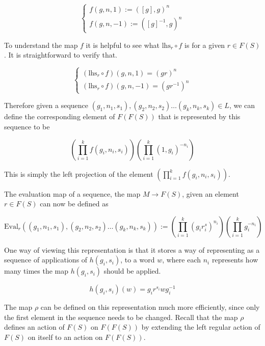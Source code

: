 \documentclass[12pt]{article} %
\theoremstyle{definition}
\theoremstyle{definition}
\theoremstyle{definition}
\theoremstyle{definition}
\theoremstyle{definition}
\theoremstyle{definition}
\begin{document}
\begin{equation}
  \begin{cases}
    f(g, n, 1) := ([g], g) ^ n \\
    f(g, n, -1) := ([g]^{-1}, g)^n
  \end{cases}
\end{equation}

To understand the map $f$ it is helpful to see what $\text{lhs}_r \circ f$ is for a given
$r \in F(S)$. It is straightforward to verify that.

\begin{equation}
  \begin{cases}
    (\text{lhs}_r \circ f)(g, n, 1) = (gr)^n \\
    (\text{lhs}_r \circ f)(g, n, -1) = (gr^{-1})^n
  \end{cases}
\end{equation}

Therefore given a sequence $(g_1, n_1, s_1), (g_2, n_2,s_2) \dots (g_k, n_k,s_k) \in L$,
we can define the corresponding element of $F(F(S))$ that is represented by this
sequence to be

\begin{equation}
    \left(\prod_{i=1}^k f(g_i, n_i, s_i)\right)\left(\prod_{i=1}^k (1, g_i)^{-n_i}\right)
\end{equation}

This is simply the left projection of the element $\left(\prod_{i=1}^k f(g_i, n_i, s_i)\right)$.

The evaluation map of a sequence, the map $M \to F(S)$, given an element $r \in F(S)$
can now be defined as

\begin{equation}
  \text{Eval}_r((g_1, n_1, s_1), (g_2, n_2,s_2) \dots (g_k, n_k,s_k)) :=
  \left(\prod_{i=1}^k (g_ir^s_i)^{n_i}\right)\left(\prod_{i=1}^k g_i^{-n_i}\right)
\end{equation}

One way of viewing this representation is that it stores a way of representing
as a sequence of applications of $h(g_i,s_i)$, to a word $w$, where each $n_i$
represents how many times the map $h(g_i, s_i)$ should be applied.

\begin{equation}
  h(g_i, s_i)(w) = g_ir^{s_i}wg_i^{-1}
\end{equation}

The map $\rho$ can be defined on this representation much more efficiently,
since only the first
element in the sequence needs to be changed. Recall that the map
$\rho$ defines an action of $F(S)$ on $F(F(S))$ by extending the left regular
action of $F(S)$ on itself to an action on $F(F(S))$.
\end{document}
